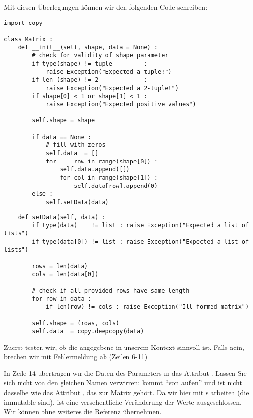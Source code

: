 Mit diesen Überlegungen können wir den folgenden Code schreiben:
\begin{codebox}
\begin{verbatim}
import copy

class Matrix :
    def __init__(self, shape, data = None) :
        # check for validity of shape parameter
        if type(shape) != tuple         :
            raise Exception("Expected a tuple!")
        if len (shape) != 2             :
            raise Exception("Expected a 2-tuple!")
        if shape[0] < 1 or shape[1] < 1 :
            raise Exception("Expected positive values")
        
        self.shape = shape
        
        if data == None :
            # fill with zeros
            self.data  = []
            for     row in range(shape[0]) :
                self.data.append([])
                for col in range(shape[1]) :
                    self.data[row].append(0)
        else :
            self.setData(data)
\end{verbatim}
\end{codebox}
\begin{codebox}[]
\begin{verbatim}
    def setData(self, data) :
        if type(data)    != list : raise Exception("Expected a list of lists")
        if type(data[0]) != list : raise Exception("Expected a list of lists")
        
        rows = len(data)
        cols = len(data[0])
        
        # check if all provided rows have same length
        for row in data :
            if len(row) != cols : raise Exception("Ill-formed matrix")
        
        self.shape = (rows, cols)
        self.data  = copy.deepcopy(data)
\end{verbatim}
\end{codebox}

Zuerst testen wir, ob die angegebene  in unserem Kontext sinnvoll ist. Falls nein, brechen wir mit Fehlermeldung ab (Zeilen 6-11). 

In Zeile 14 übertragen wir die Daten des Parameters  in das Attribut . Lassen Sie sich nicht von den gleichen Namen verwirren:  kommt \enquote{von außen} und ist nicht dasselbe wie das Attribut , das zur Matrix gehört. Da wir hier mit s arbeiten (die immutable sind), ist eine versehentliche Veränderung der Werte ausgeschlossen. Wir können ohne weiteres die Referenz übernehmen.

